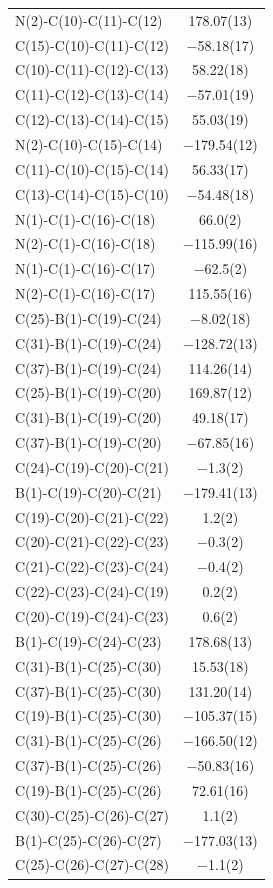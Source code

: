 \begin{center}
{\begin{supertabular}{p{1.5in}c}
N(2)-C(10)-C(11)-C(12)&178.07(13)\\
C(15)-C(10)-C(11)-C(12)&$-$58.18(17)\\
C(10)-C(11)-C(12)-C(13)&58.22(18)\\
C(11)-C(12)-C(13)-C(14)&$-$57.01(19)\\
C(12)-C(13)-C(14)-C(15)&55.03(19)\\
N(2)-C(10)-C(15)-C(14)&$-$179.54(12)\\
C(11)-C(10)-C(15)-C(14)&56.33(17)\\
C(13)-C(14)-C(15)-C(10)&$-$54.48(18)\\
N(1)-C(1)-C(16)-C(18)&66.0(2)\\
N(2)-C(1)-C(16)-C(18)&$-$115.99(16)\\
N(1)-C(1)-C(16)-C(17)&$-$62.5(2)\\
N(2)-C(1)-C(16)-C(17)&115.55(16)\\
C(25)-B(1)-C(19)-C(24)&$-$8.02(18)\\
C(31)-B(1)-C(19)-C(24)&$-$128.72(13)\\
C(37)-B(1)-C(19)-C(24)&114.26(14)\\
C(25)-B(1)-C(19)-C(20)&169.87(12)\\
C(31)-B(1)-C(19)-C(20)&49.18(17)\\
C(37)-B(1)-C(19)-C(20)&$-$67.85(16)\\
C(24)-C(19)-C(20)-C(21)&$-$1.3(2)\\
B(1)-C(19)-C(20)-C(21)&$-$179.41(13)\\
C(19)-C(20)-C(21)-C(22)&1.2(2)\\
C(20)-C(21)-C(22)-C(23)&$-$0.3(2)\\
C(21)-C(22)-C(23)-C(24)&$-$0.4(2)\\
C(22)-C(23)-C(24)-C(19)&0.2(2)\\
C(20)-C(19)-C(24)-C(23)&0.6(2)\\
B(1)-C(19)-C(24)-C(23)&178.68(13)\\
C(31)-B(1)-C(25)-C(30)&15.53(18)\\
C(37)-B(1)-C(25)-C(30)&131.20(14)\\
C(19)-B(1)-C(25)-C(30)&$-$105.37(15)\\
C(31)-B(1)-C(25)-C(26)&$-$166.50(12)\\
C(37)-B(1)-C(25)-C(26)&$-$50.83(16)\\
C(19)-B(1)-C(25)-C(26)&72.61(16)\\
C(30)-C(25)-C(26)-C(27)&1.1(2)\\
B(1)-C(25)-C(26)-C(27)&$-$177.03(13)\\
C(25)-C(26)-C(27)-C(28)&$-$1.1(2)\\

\end{supertabular}}
\end{center}
